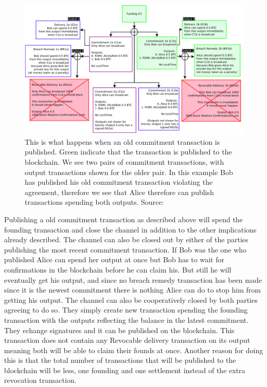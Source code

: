 \documentclass[informationsecurity]{gucmasterproject}
\begin{document}
\begin{figure}[h]
    \centering
    \includegraphics[width=14cm]{ln_breach.png}
    \caption{This is what happens when an old commitment transaction is published. Green indicate that the transaction is published to the blockchain. We see two pairs of commitment transactions, with output transactions shown for the older pair. In this example Bob has published his old commitment transaction violating the agreement, therefore we see that Alice therefore can publish transactions spending both outputs.   Source: \cite{poon2015bitcoin}}
    \label{fig:ln_breach}
\end{figure}

Publishing a old commitment transaction as described above will spend the founding transaction and close the channel in addition to the other implications already described.
The channel can also be closed out by either of the parties publishing the most recent commitment transaction. If Bob was the one who published Alice can spend her output at once but Bob has to wait for confirmations in the blockchain before he can claim his. But still he will eventually get his output, and since no breach remedy transaction has been made since it is the newest commitment there is nothing Alice can do to stop him from getting his output.
The channel can also be cooperatively closed by both parties agreeing to do so. They simply create new transaction spending the founding transaction with the outputs reflecting the balance in the latest commitment. They echange signatures and it can be published on the blockchain. This transaction does not contain any Revocable delivery transaction on its output meaning both will be able to claim their founds at once. 
Another reason for doing this is that the total number of transactions that will be published to the blockchain will be less, one founding and one settlement instead of the extra revocation transaction.
\end{document}
